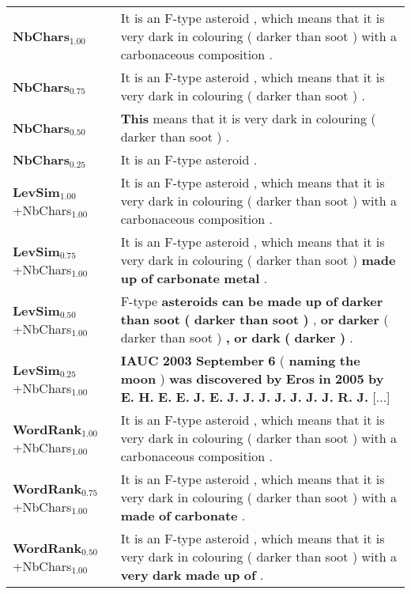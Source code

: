 \documentclass[10pt, a4paper]{article}
\begin{document}
\begin{table*}
{\begin{tabular}{ll}
\midrule
\textbf{NbChars$_{1.00}$} & It is an F-type asteroid , which means that it is very dark in colouring ( darker than soot ) with a carbonaceous composition . \\
\textbf{NbChars$_{0.75}$} & It is an F-type asteroid , which means that it is very dark in colouring ( darker than soot ) . \\
\textbf{NbChars$_{0.50}$} & \textbf{This} means that it is very dark in colouring ( darker than soot ) . \\
\textbf{NbChars$_{0.25}$} & It is an F-type asteroid . \\
\midrule
\textbf{LevSim$_{1.00}$}\footnotesize{+NbChars$_{1.00}$} & It is an F-type asteroid , which means that it is very dark in colouring ( darker than soot ) with a carbonaceous composition . \\
\textbf{LevSim$_{0.75}$}\footnotesize{+NbChars$_{1.00}$} & It is an F-type asteroid , which means that it is very dark in colouring ( darker than soot ) \textbf{made} \textbf{up} \textbf{of} \textbf{carbonate} \textbf{metal} . \\
\textbf{LevSim$_{0.50}$}\footnotesize{+NbChars$_{1.00}$} & F-type \textbf{asteroids} \textbf{can} \textbf{be} \textbf{made} \textbf{up} \textbf{of} \textbf{darker} \textbf{than} \textbf{soot} \textbf{(} \textbf{darker} \textbf{than} \textbf{soot} \textbf{)} , \textbf{or} \textbf{darker} ( darker than soot ) \textbf{,} \textbf{or} \textbf{dark} \textbf{(} \textbf{darker} \textbf{)} . \\
\textbf{LevSim$_{0.25}$}\footnotesize{+NbChars$_{1.00}$} & \textbf{IAUC} \textbf{2003} \textbf{September} \textbf{6} ( \textbf{naming} \textbf{the} \textbf{moon} ) \textbf{was} \textbf{discovered} \textbf{by} \textbf{Eros} \textbf{in} \textbf{2005} \textbf{by} \textbf{E.} \textbf{H.} \textbf{E.} \textbf{E.} \textbf{J.} \textbf{E.} \textbf{J.} \textbf{J.} \textbf{J.} \textbf{J.} \textbf{J.} \textbf{J.} \textbf{J.} \textbf{R.} \textbf{J.} [...] \\
\midrule
\textbf{WordRank$_{1.00}$}\footnotesize{+NbChars$_{1.00}$} & It is an F-type asteroid , which means that it is very dark in colouring ( darker than soot ) with a carbonaceous composition . \\
\textbf{WordRank$_{0.75}$}\footnotesize{+NbChars$_{1.00}$} & It is an F-type asteroid , which means that it is very dark in colouring ( darker than soot ) with a \textbf{made} \textbf{of} \textbf{carbonate} . \\
\textbf{WordRank$_{0.50}$}\footnotesize{+NbChars$_{1.00}$} & It is an F-type asteroid , which means that it is very dark in colouring ( darker than soot ) with a \textbf{very} \textbf{dark} \textbf{made} \textbf{up} \textbf{of} . \\

\end{tabular}}
\end{table*}
\end{document}

